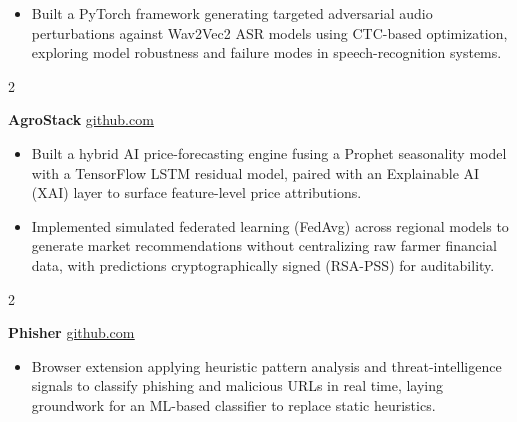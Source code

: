 \documentclass[10pt, a4paper]{article}
\newenvironment{highlights}{
    \begin{itemize}[
        topsep=0.10 cm,
        parsep=0.10 cm,
        partopsep=0pt,
        itemsep=0pt,
        leftmargin=0 cm + 10pt
    ]
}{
    \end{itemize}
} %
\newenvironment{twocolentry}[2][]{
    \onecolentry
    \def\secondColumn{#2}
    \setcolumnwidth{\fill, 4.5 cm}
    \begin{paracol}{2}
}{
    \switchcolumn \raggedleft \secondColumn
    \end{paracol}
    \endonecolentry
} %
\begin{document}
        \vspace{0.01 cm}

            \begin{highlights}
                \item Built a PyTorch framework generating targeted adversarial audio perturbations against Wav2Vec2 ASR models using CTC-based optimization, exploring model robustness and failure modes in speech-recognition systems.
            \end{highlights}

        \vspace{0.01 cm}

        \begin{twocolentry}{
            \href{https://github.com/TimsTittus/AgroStack}{\underline{github.com}}
        }
            \textbf{AgroStack}\end{twocolentry}

        \vspace{0.01 cm}

            \begin{highlights}
                \item Built a hybrid AI price-forecasting engine fusing a Prophet seasonality model with a TensorFlow LSTM residual model, paired with an Explainable AI (XAI) layer to surface feature-level price attributions.
                \item Implemented simulated federated learning (FedAvg) across regional models to generate market recommendations without centralizing raw farmer financial data, with predictions cryptographically signed (RSA-PSS) for auditability.
            \end{highlights}

        \vspace{0.01 cm}

        \begin{twocolentry}{
            \href{https://github.com/TimsTittus/Phisher}{\underline{github.com}}
        }
            \textbf{Phisher}\end{twocolentry}

        \vspace{0.01 cm}

            \begin{highlights}
                \item Browser extension applying heuristic pattern analysis and threat-intelligence signals to classify phishing and malicious URLs in real time, laying groundwork for an ML-based classifier to replace static heuristics.
            \end{highlights}
\end{document}
